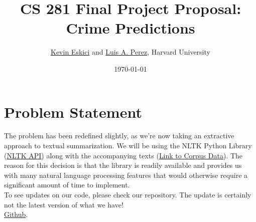 \documentclass[10pt]{article}
\title{CS 281 Final Project Proposal: Crime Predictions}
\author{\href{mailto:keskici@college.harvard.edu}{Kevin Eskici} and \href{mailto:luisperez@college.harvard.edu}{Luis A. Perez}, Harvard University}
\date{\today}
\begin{document}
 \begin{center}
  \end{center}

\section{Problem Statement}
The problem has been redefined slightly, as we're now taking an extractive approach to textual summarization. We will be using the NLTK Python Library (\href{http://www.nltk.org/api/nltk.html}{NLTK API}) along with the accompanying texts (\href{http://www.nltk.org/nltk_data/}{Link to Corpus Data}). The reason for this decision is that the library is readily available and provides us with many natural language processing features that would otherwise require a significant amount of time to implement. \\

To see updates on our code, please check our repository. The update is certainly not the latest version of what we have!\\
\href{https://github.com/kandluis/document_summaries}{Github}.
\end{document}
